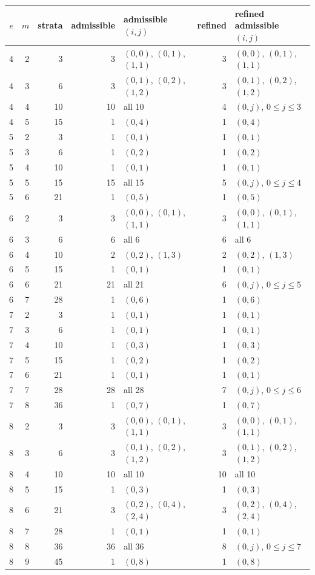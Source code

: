 \begin{tabular}{@{}rrrr>{\raggedright\arraybackslash}p{4.2cm}r>{\raggedright\arraybackslash}p{3.6cm}@{}}
\toprule
$e$ & $m$ & strata & admissible & admissible $(i,j)$ & refined & refined admissible $(i,j)$\\
\midrule
4 & 2 & 3 & 3 & $(0,0)$, $(0,1)$, $(1,1)$ & 3 & $(0,0)$, $(0,1)$, $(1,1)$\\
4 & 3 & 6 & 3 & $(0,1)$, $(0,2)$, $(1,2)$ & 3 & $(0,1)$, $(0,2)$, $(1,2)$\\
4 & 4 & 10 & 10 & all 10 & 4 & $(0,j)$, $0\le j\le 3$\\
4 & 5 & 15 & 1 & $(0,4)$ & 1 & $(0,4)$\\
5 & 2 & 3 & 1 & $(0,1)$ & 1 & $(0,1)$\\
5 & 3 & 6 & 1 & $(0,2)$ & 1 & $(0,2)$\\
5 & 4 & 10 & 1 & $(0,1)$ & 1 & $(0,1)$\\
5 & 5 & 15 & 15 & all 15 & 5 & $(0,j)$, $0\le j\le 4$\\
5 & 6 & 21 & 1 & $(0,5)$ & 1 & $(0,5)$\\
6 & 2 & 3 & 3 & $(0,0)$, $(0,1)$, $(1,1)$ & 3 & $(0,0)$, $(0,1)$, $(1,1)$\\
6 & 3 & 6 & 6 & all 6 & 6 & all 6\\
6 & 4 & 10 & 2 & $(0,2)$, $(1,3)$ & 2 & $(0,2)$, $(1,3)$\\
6 & 5 & 15 & 1 & $(0,1)$ & 1 & $(0,1)$\\
6 & 6 & 21 & 21 & all 21 & 6 & $(0,j)$, $0\le j\le 5$\\
6 & 7 & 28 & 1 & $(0,6)$ & 1 & $(0,6)$\\
7 & 2 & 3 & 1 & $(0,1)$ & 1 & $(0,1)$\\
7 & 3 & 6 & 1 & $(0,1)$ & 1 & $(0,1)$\\
7 & 4 & 10 & 1 & $(0,3)$ & 1 & $(0,3)$\\
7 & 5 & 15 & 1 & $(0,2)$ & 1 & $(0,2)$\\
7 & 6 & 21 & 1 & $(0,1)$ & 1 & $(0,1)$\\
7 & 7 & 28 & 28 & all 28 & 7 & $(0,j)$, $0\le j\le 6$\\
7 & 8 & 36 & 1 & $(0,7)$ & 1 & $(0,7)$\\
8 & 2 & 3 & 3 & $(0,0)$, $(0,1)$, $(1,1)$ & 3 & $(0,0)$, $(0,1)$, $(1,1)$\\
8 & 3 & 6 & 3 & $(0,1)$, $(0,2)$, $(1,2)$ & 3 & $(0,1)$, $(0,2)$, $(1,2)$\\
8 & 4 & 10 & 10 & all 10 & 10 & all 10\\
8 & 5 & 15 & 1 & $(0,3)$ & 1 & $(0,3)$\\
8 & 6 & 21 & 3 & $(0,2)$, $(0,4)$, $(2,4)$ & 3 & $(0,2)$, $(0,4)$, $(2,4)$\\
8 & 7 & 28 & 1 & $(0,1)$ & 1 & $(0,1)$\\
8 & 8 & 36 & 36 & all 36 & 8 & $(0,j)$, $0\le j\le 7$\\
8 & 9 & 45 & 1 & $(0,8)$ & 1 & $(0,8)$\\
\bottomrule
\end{tabular}
